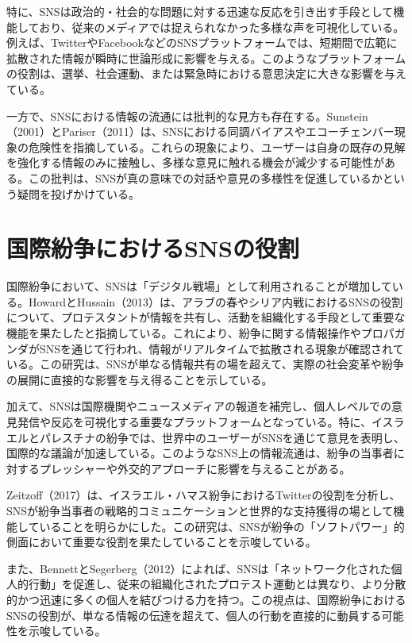 \documentclass[11pt, a4j]{jreport}
\begin{document}
    特に、SNSは政治的・社会的な問題に対する迅速な反応を引き出す手段として機能しており、従来のメディアでは捉えられなかった多様な声を可視化している。例えば、TwitterやFacebookなどのSNSプラットフォームでは、短期間で広範に拡散された情報が瞬時に世論形成に影響を与える。このようなプラットフォームの役割は、選挙、社会運動、または緊急時における意思決定に大きな影響を与えている。

    一方で、SNSにおける情報の流通には批判的な見方も存在する。Sunstein（2001）とPariser（2011）は、SNSにおける同調バイアスやエコーチェンバー現象の危険性を指摘している。これらの現象により、ユーザーは自身の既存の見解を強化する情報のみに接触し、多様な意見に触れる機会が減少する可能性がある。この批判は、SNSが真の意味での対話や意見の多様性を促進しているかという疑問を投げかけている。

    \section{国際紛争におけるSNSの役割}
    国際紛争において、SNSは「デジタル戦場」として利用されることが増加している。HowardとHussain（2013）は、アラブの春やシリア内戦におけるSNSの役割について、プロテスタントが情報を共有し、活動を組織化する手段として重要な機能を果たしたと指摘している。これにより、紛争に関する情報操作やプロパガンダがSNSを通じて行われ、情報がリアルタイムで拡散される現象が確認されている。この研究は、SNSが単なる情報共有の場を超えて、実際の社会変革や紛争の展開に直接的な影響を与え得ることを示している。

    加えて、SNSは国際機関やニュースメディアの報道を補完し、個人レベルでの意見発信や反応を可視化する重要なプラットフォームとなっている。特に、イスラエルとパレスチナの紛争では、世界中のユーザーがSNSを通じて意見を表明し、国際的な議論が加速している。このようなSNS上の情報流通は、紛争の当事者に対するプレッシャーや外交的アプローチに影響を与えることがある。

    Zeitzoff（2017）は、イスラエル・ハマス紛争におけるTwitterの役割を分析し、SNSが紛争当事者の戦略的コミュニケーションと世界的な支持獲得の場として機能していることを明らかにした。この研究は、SNSが紛争の「ソフトパワー」的側面において重要な役割を果たしていることを示唆している。

    また、BennettとSegerberg（2012）によれば、SNSは「ネットワーク化された個人的行動」を促進し、従来の組織化されたプロテスト運動とは異なり、より分散的かつ迅速に多くの個人を結びつける力を持つ。この視点は、国際紛争におけるSNSの役割が、単なる情報の伝達を超えて、個人の行動を直接的に動員する可能性を示唆している。
\end{document}
